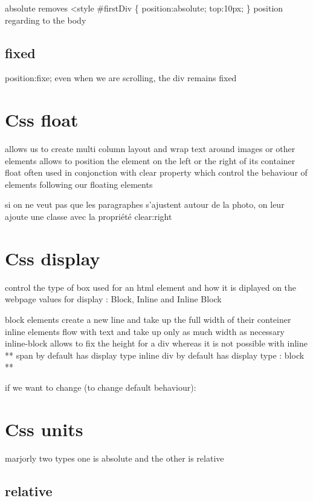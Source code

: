 \documentclass[
]{book}
\begin{document}
absolute removes
\textless style
\#firstDiv \{
position:absolute;
top:10px;
\}
position regarding to the body

\hypertarget{fixed}{%
\subsection{fixed}\label{fixed}}

position:fixe;
even when we are scrolling, the div remains fixed

\hypertarget{css-float}{%
\section{Css float}\label{css-float}}

allows us to create multi column layout and wrap text around images or other elements
allows to position the element on the left or the right of its container
float often used in conjonction with clear property which control the behaviour of elements following our floating elements

si on ne veut pas que les paragraphes s'ajustent autour de la photo,
on leur ajoute une classe avec la propriété clear:right

\hypertarget{css-display}{%
\section{Css display}\label{css-display}}

control the type of box used for an html element and how it is diplayed on the webpage
values for display : Block, Inline and Inline Block

block elements create a new line and take up the full width of their conteiner
inline elements flow with text and take up only as much width as necessary
inline-block allows to fix the height for a div whereas it is not possible with inline
** span by default has display type inline div by default has display type : block **

if we want to change (to change default behaviour):

\hypertarget{css-units}{%
\section{Css units}\label{css-units}}

marjorly two types one is absolute and the other is relative

\hypertarget{relative-1}{%
\subsection{relative}\label{relative-1}}
\end{document}

